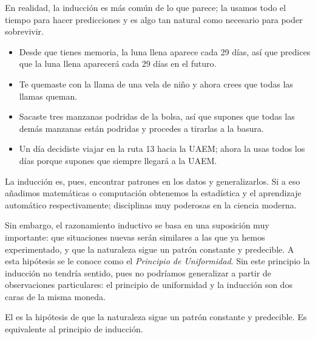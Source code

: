 En realidad, la inducción es más común de lo que parece; la usamos todo el
tiempo para hacer predicciones y es algo tan natural como necesario para poder
sobrevivir.
\begin{itemize}
    \item Desde que tienes memoria, la luna llena aparece cada 29 días, así que
          predices que la luna llena aparecerá cada 29 días en el futuro.
    \item Te quemaste con la llama de una vela de niño y ahora crees que todas
          las llamas queman.
    \item Sacaste tres manzanas podridas de la bolsa, así que supones que todas
          las demás manzanas están podridas y procedes a tirarlas a la basura.
    \item Un día decidiste viajar en la ruta 13 hacia la UAEM; ahora la usas
          todos los días porque supones que siempre llegará a la UAEM.
\end{itemize}

La inducción es, pues, encontrar patrones en los datos y generalizarlos.
Si a eso añadimos matemáticas o computación obtenemos la estadística y el
aprendizaje automático respectivamente; disciplinas muy poderosas en la ciencia
moderna.

Sin embargo, el razonamiento inductivo se basa en una suposición muy importante:
que situaciones nuevas serán similares a las que ya hemos experimentado, y que
la naturaleza sigue un patrón constante y predecible.
A esta hipótesis se le conoce como el \emph{Principio de Uniformidad}.
Sin este principio la inducción no tendría sentido, pues no podríamos
generalizar a partir de observaciones particulares: el principio de uniformidad
y la inducción son dos caras de la misma moneda.

\begin{remember}
    \label{rem:principio de uniformidad}
    El  es la hipótesis de que la
    naturaleza sigue un patrón constante y predecible.
    Es equivalente al principio de inducción.
\end{remember}

